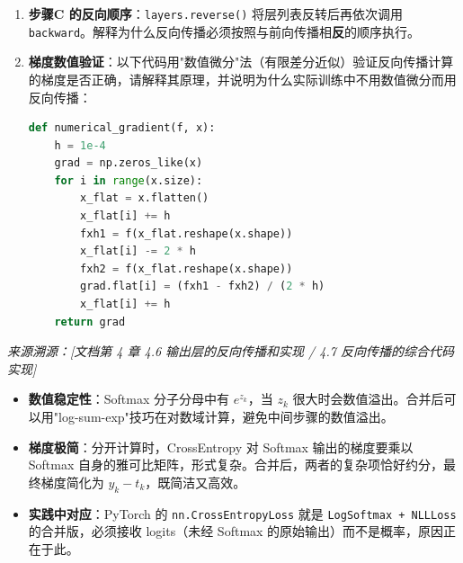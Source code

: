 \documentclass[a4paper,11pt]{ctexart}
\begin{document}
\begin{problembox}
\begin{enumerate}[(1)]
        \item \textbf{步骤C 的反向顺序}：\texttt{layers.reverse()} 将层列表反转后再依次调用 \texttt{backward}。解释为什么反向传播必须按照与前向传播相\textbf{反}的顺序执行。

        \item \textbf{梯度数值验证}：以下代码用"数值微分"法（有限差分近似）验证反向传播计算的梯度是否正确，请解释其原理，并说明为什么实际训练中不用数值微分而用反向传播：
        \begin{lstlisting}[language=Python]
def numerical_gradient(f, x):
    h = 1e-4
    grad = np.zeros_like(x)
    for i in range(x.size):
        x_flat = x.flatten()
        x_flat[i] += h
        fxh1 = f(x_flat.reshape(x.shape))
        x_flat[i] -= 2 * h
        fxh2 = f(x_flat.reshape(x.shape))
        grad.flat[i] = (fxh1 - fxh2) / (2 * h)
        x_flat[i] += h
    return grad
        \end{lstlisting}
    \end{enumerate}

    \vspace{0.2cm}
    {\color{gray}\small\textit{来源溯源：[文档第 4 章 4.6 输出层的反向传播和实现 / 4.7 反向传播的综合代码实现]}}
\end{problembox}

\begin{beginnerbox}
    \begin{itemize}
        \item \textbf{数值稳定性}：Softmax 分子分母中有 $e^{z_k}$，当 $z_k$ 很大时会数值溢出。合并后可以用"log-sum-exp"技巧在对数域计算，避免中间步骤的数值溢出。
        \item \textbf{梯度极简}：分开计算时，CrossEntropy 对 Softmax 输出的梯度要乘以 Softmax 自身的雅可比矩阵，形式复杂。合并后，两者的复杂项恰好约分，最终梯度简化为 $y_k - t_k$，既简洁又高效。
        \item \textbf{实践中对应}：PyTorch 的 \texttt{nn.CrossEntropyLoss} 就是 \texttt{LogSoftmax + NLLLoss} 的合并版，必须接收 logits（未经 Softmax 的原始输出）而不是概率，原因正在于此。
    \end{itemize}
\end{beginnerbox}
\end{document}

